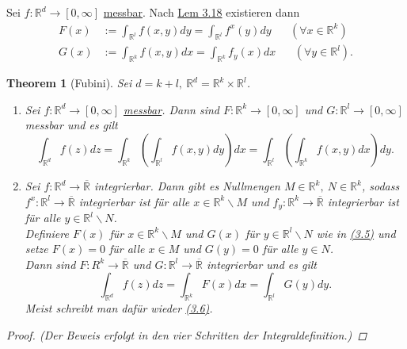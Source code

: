 \documentclass[a4paper]{scrreprt}
\newcommand{\R}{\mathbb{R}}
\newcommand{\Rq}{\overline{\R}}
\newcommand{\jlabel}[1]{\label{j_#1}}
\newcommand{\jhyperref}[2]{\hyperref[j_#1]{#2}}
\newcommand{\jlink}[1]{\jhyperref{#1}{#1}}
\newcommand{\jabb}[3]{ #1: #2 \rightarrow #3 }
\theoremstyle{plain}
\newtheorem{thm}{Theorem}[chapter]
\theoremstyle{definition}
\begin{document}
{{{{Sei $\jabb{f}{\R^d}{[0,\infty]}$ \jlink{messbar}. Nach \jlink{Lem 3.18} existieren dann
\jlabel{(3.5)}
\begin{equation}
    \begin{split}
        F(x) &:= \int_{\R^l} f(x,y)dy = \int_{\R^l}f^x(y)dy \hspace{20pt} (\forall x\in \R^k)\\
        G(x) &:= \int_{\R^k} f(x,y)dx = \int_{\R^k} f_y(x)dx \hspace{20pt} (\forall y\in \R^l).
    \end{split}
\end{equation}


\begin{thm}[Fubini]
\jlabel{Thm 3.27}
\jlabel{Fubini}
    Sei $d=k+l,\ \R^d = \R^k\times \R^l$.
    \begin{enumerate}
        \item
            \jlabel{FubiniA}
            Sei $\jabb{f}{\R^d}{[0,\infty]}$ \jlink{messbar}. Dann sind $\jabb{F}{\R^k}{[0,\infty]}$ und  $\jabb{G}{\R^l}{[0,\infty]}$ messbar und es gilt
            \jlabel{(3.6)}
            \begin{equation}
                \int_{\R^d} f(z)dz = \int_{\R^k} \left( \int_{\R^l} f(x,y)dy \right)dx = \int_{\R^l} \left( \int_{\R^k} f(x,y)dx \right)dy.
            \end{equation}
        \item
            \jlabel{FubiniB}
            Sei $\jabb{f}{\R^d}{\Rq}$ integrierbar. Dann gibt es Nullmengen $M\in\R^k,\ N\in \R^k$, sodass $\jabb{f^x}{\R^l}{\Rq}$ integrierbar ist für alle $x\in\R^k\backslash M$ und $\jabb{f_y}{\R^k}{\Rq}$ integrierbar ist für alle $y\in \R^l\backslash N$.\\
            Definiere $F(x)$ für $x\in \R^k\backslash M$ und $G(x)$ für $y\in \R^l\backslash N$ wie in \jlink{(3.5)} und setze $F(x)=0$ für alle $x\in M$ und $G(y)=0$ für alle $y\in N$.\\
            Dann sind $\jabb{F}{R^k}{\Rq}$ und $\jabb{G}{\R^l}{\Rq}$ integrierbar und es gilt
            \begin{displaymath}
                \int_{\R^d} f(z) dz = \int_{\R^k} F(x)dx = \int_{\R^l} G(y) dy.
            \end{displaymath}
            Meist schreibt man dafür wieder \jlink{(3.6)}.
    \end{enumerate}
    \begin{proof}
        (Der Beweis erfolgt in den vier Schritten der Integraldefinition.)

\end{proof}
\end{thm}}}}}
\end{document}
